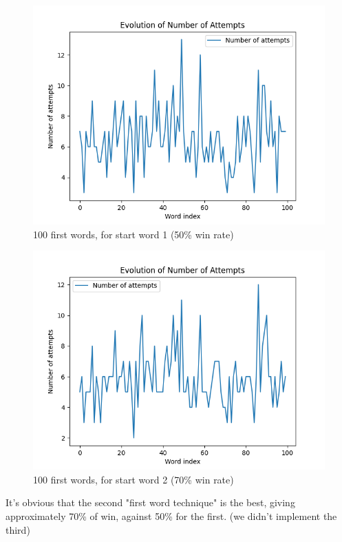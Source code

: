 \begin{figure}[!h]
\centering
\includegraphics[scale=0.7]{images/start1.png}
\caption{100 first words, for start word 1 (50\% win rate)}
\label{start1}
\end{figure}

\begin{figure}[!h]
\centering
\includegraphics[scale=0.7]{images/start2.png}
\caption{100 first words, for start word 2 (70\% win rate)}
\label{start2}
\end{figure}

\newpage

It's obvious that the second "first word technique" is the best, giving approximately 70\% of win, against 50\% for the first. (we didn't implement the third)

